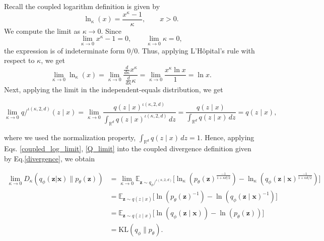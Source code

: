 \documentclass[twoside,11pt]{article}
\renewenvironment{proof}{\par\noindent{\bf Proof\ }}{\hfill\BlackBox\par\vspace{2mm}}
\begin{document}
\begin{proof}
Recall the coupled logarithm definition is given by
\[
\ln_\kappa(x)
=
\frac{x^\kappa - 1}{\kappa},
\qquad x>0.
\]
We compute the limit as $\kappa \to 0$. Since
\[
\lim_{\kappa\to0} x^\kappa - 1 = 0,
\qquad
\lim_{\kappa\to0} \kappa = 0,
\]
the expression is of indeterminate form $0/0$. Thus, applying L'H\^opital's rule with respect to $\kappa$, we get
\begin{equation} \label{coupled_log_limit}
    \lim_{\kappa\to0}
\ln_\kappa(x)
=
\lim_{\kappa\to0}
\frac{\frac{d}{d\kappa} x^\kappa}
{\frac{d}{d\kappa} \kappa} = \lim_{\kappa\to0} \frac{x^\kappa \ln x}{1} = \ln x.
\end{equation}
Next, applying the limit in the independent-equals distribution, we get 

\begin{equation} \label{Q_limit}
   \lim_{\kappa\to0}
q/^{\iota(\kappa,2,d)}(z \mid x)
=\lim_{\kappa\to0}\frac{q(z \mid x)^{\iota(\kappa,2,d)}}
{\int_{\mathbb{R}^d}
q(z \mid x)^{\iota(\kappa,2,d)}
\, dz}
=\frac{q(z \mid x)}{\int_{\mathbb{R}^d} q(z \mid x) \, dz} = q(z \mid x),
\end{equation}

where we used the normalization property, $\int_{\mathbb{R}^d} q(z \mid x) \, dz = 1$. Hence, applying Eqs. \eqref{coupled_log_limit}, \eqref{Q_limit} into the coupled divergence definition given by Eq.\eqref{divergence}, we obtain

\begin{equation} \label{Divergence_limit}
    \begin{split}
\lim_{\kappa\to0}
D_{\kappa}\left(q_{\phi}(\mathbf{z}|\mathbf{x})
\big\|p_{\theta}(\mathbf{z})\right)
& =\lim_{\kappa\to0}
\mathbb{E}_{\mathbf{z} \sim q_\phi/^{\iota(\kappa,2,d)}}
\Big[\ln_{\kappa}\!\left(
p_\theta(\mathbf{z})^{\frac{-1}{1+\kappa d/2}}
\right) - \ln_{\kappa}\!\left(
q_\phi(\mathbf{z}\mid \boldsymbol{x})^{\frac{-1}{1+\kappa d/2}}\right)\Big]
\\
& =
\mathbb{E}_{\mathbf{z} \sim q(z \mid x)}\Big[\ln\!\left(p_\theta(\mathbf{z})^{-1}
\right) - \ln\!\left(
q_\phi(\mathbf{z}\mid \boldsymbol{x})^{-1}
\right)\Big]
\\
& =
\mathbb{E}_{\mathbf{z} \sim q(z \mid x)}
\Big[\ln\!\left(q_\phi(\mathbf{z}\mid \boldsymbol{x})\right) - \ln\!\left(
p_\theta(\mathbf{z})\right)\Big]
\\
& =
\mathrm{KL}(q_\phi\|p_\theta).
\end{split}
\end{equation}


\end{proof}
\end{document}
